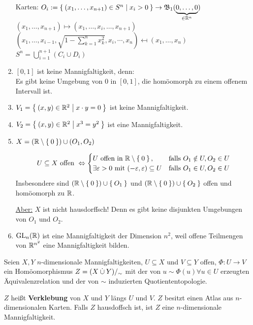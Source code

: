 \begin{beispiel}
\begin{enumerate}[label=\arabic*)]
              Karten: $O_i := \Set{(x_1, \dots, x_{n+1}) \in S^n | x_i > 0} \rightarrow \mathfrak{B}_1 (\underbrace{0, \dots, 0}_{\in \mathbb{R}^n})$\\
              $(x_1, \dots, x_{n+1}) \mapsto (x_1, \dots, x_i, \dots, x_{n+1})$\\
              $(x_1, \dots, x_{i-1}, \sqrt{1-\sum_{k=1}^n x_k^2}, x_i, \cdots, x_n)\mapsfrom (x_1, \dots, x_n)$\\
              $S^n = \bigcup_{i=1}^{n+1} (C_i \cup D_i)$
        \item $[0,1]$ ist keine Mannigfaltigkeit, denn:\\
              Es gibt keine Umgebung von $0$ in $[0,1]$, die homöomorph
              zu einem offenem Intervall ist.
        \item $V_1 = \Set{(x,y) \in \ensuremath{\mathbb{R}}^2 | x \cdot y = 0}$ ist
              keine Mannigfaltigkeit.
        \item $V_2 = \Set{(x,y) \in \ensuremath{\mathbb{R}}^2 | x^3 = y^2}$ ist eine
              Mannigfaltigkeit.
        \item $X = (\mathbb{R} \setminus \Set{0}) \cup (O_1, O_2)$

              \[U \subseteq X \text{ offen } \Leftrightarrow 
                \begin{cases}
                    U \text{ offen in } \mathbb{R} \setminus \Set{0}, &\text{falls } O_1 \notin U, O_2 \in U\\
                    \exists \varepsilon > 0 \text{ mit } (-\varepsilon, \varepsilon) \subseteq U &\text{falls } O_1 \in U, O_2 \in U
                \end{cases}\]
              Insbesondere sind $(\mathbb{R} \setminus \Set{0}) \cup \Set{O_1}$
              und $(\mathbb{R} \setminus \Set{0}) \cup \Set{O_2}$ offen und
              homöomorph zu $\mathbb{R}$.

              \underline{Aber:} $X$ ist nicht hausdorffsch!
              Denn es gibt keine disjunkten Umgebungen von $O_1$ und
              $O_2$.
        \item $\mathrm{GL}_n(\mathbb{R})$ ist eine Mannigfaltigkeit der Dimension 
              $n^2$, weil offene Teilmengen von $\mathbb{R}^{n^2}$ eine
              Mannigfaltigkeit bilden.
    \end{enumerate}
\end{beispiel}

\begin{definition}
    Seien $X, Y$ $n$-dimensionale Mannigfaltigkeiten, $U \subseteq X$
    und $V \subseteq Y$ offen, $\Phi: U \rightarrow V$ ein Homöomorphismus
    $Z = (X \mathbin{\dot{\cup}} Y) /_\sim$ mit der von $u \sim \Phi(u) \forall{u \in U}$
    erzeugten Äquivalenzrelation und der von $\sim$ induzierten 
    Quotiententopologie.

    $Z$ heißt \textbf{Verklebung} von $X$ und $Y$ längs $U$ und $V$.
    $Z$ besitzt einen Atlas aus $n$-dimensionalen Karten.
    Falls $Z$ hausdoffsch ist, ist $Z$ eine $n$-dimensionale 
    Mannigfaltigkeit.
\end{definition}

